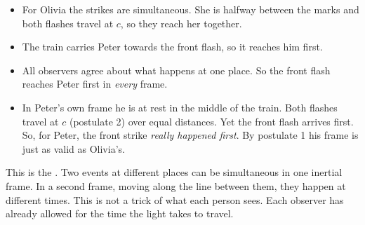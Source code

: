 \begin{itemize}
  \item For Olivia the strikes are simultaneous. She is halfway between the marks and both
        flashes travel at $c$, so they reach her together.
  \item The train carries Peter towards the front flash, so it reaches him first.
  \item All observers agree about what happens at one place. So the front flash reaches Peter
        first in \emph{every} frame.
  \item In Peter's own frame he is at rest in the middle of the train. Both flashes travel
        at $c$ (postulate 2) over equal distances. Yet the front flash arrives first. So, for
        Peter, the front strike \emph{really happened first}. By postulate 1 his frame is just
        as valid as Olivia's.
\end{itemize}
This is the . Two events at different places can be
simultaneous in one inertial frame. In a second frame, moving along the line between them, they
happen at different times. This is not a trick of what each person sees. Each observer has
already allowed for the time the light takes to travel.

